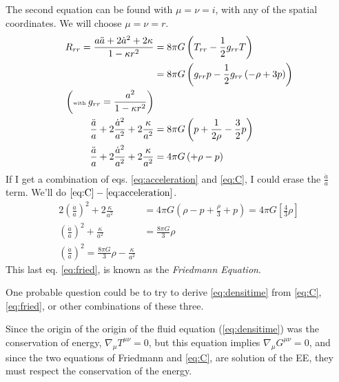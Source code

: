 The second equation can be found with $\mu  = \nu  = i$, with any of the spatial coordinates. We will choose $\mu  = \nu  = r$.
\begin{align}
	R_{rr} = \frac{a \ddot{a} + 2 \dot{a}^{2} + 2 \kappa }{1 - \kappa r^{2}} &= 8\pi G \left( T_{rr} - \frac{1}{2}g_{rr} T \right) \nonumber\\
										 &= 8\pi G \left( g_{rr}p - \frac{1}{2} g_{rr}\left( -\rho +3p \right) \right) \nonumber\\
	\left( \text{\tiny with   } g_{rr} = \frac{a^{2}}{1-\kappa r^{2}} \right) \nonumber\\
	\frac{\ddot{a}}{a} + 2 \frac{\dot{a}^{2}}{a^{2}}+ 2 \frac{\kappa }{a^{2}} &= 8\pi G \left( p + \frac{1}{2 \rho }- \frac{3}{2} p \right) \nonumber\\	
	\frac{\ddot{a}}{a} + 2 \frac{\dot{a}^{2}}{a^{2}}+ 2 \frac{\kappa }{a^{2}} &= 4\pi G\left( +\rho -p \right) \label{eq:C}
\end{align}
If I get a combination of eqs. \ref{eq:acceleration} and \ref{eq:C}, I could erase the $ \frac{\ddot{a}}{a}$ term. We'll do $\ref{eq:C} - \ref{eq:acceleration}$.
\begin{align}
	2 \left( \frac{\dot{a}}{a} \right)^{2} + 2 \frac{\kappa }{a^{2}} &= 4\pi G \left( \rho  - p + \frac{\rho }{3} +p \right) = 4\pi G \left[ \frac{4}{3}\rho  \right] \nonumber\\
	\left( \frac{\dot{a}}{a} \right)^{2} + \frac{\kappa }{a^{2}} &= \frac{8\pi G}{3}\rho  \nonumber\\
	\left( \frac{\dot{a}}{a} \right)^{2} = \frac{8\pi G}{3}\rho - \frac{\kappa }{a^{2}}\label{eq:fried}
\end{align}
This last eq. \ref{eq:fried}, is known as the \emph{Friedmann Equation}.\par

One probable question could be to try to derive \ref{eq:densitime} from \ref{eq:C}, \ref{eq:fried}, or other combinations of these three.\par

Since the origin of the origin of the fluid equation (\ref{eq:densitime}) was the conservation of energy, $\nabla _{\mu }T^{\mu \nu }=0$, but this equation implies $\nabla _{\mu }G^{\mu \nu } = 0$, and since the two equations of Friedmann and \ref{eq:C}, are solution of the EE, they must respect the conservation of the energy.

